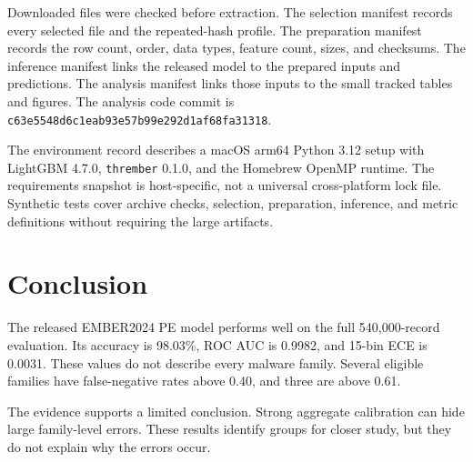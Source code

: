 \documentclass[11pt]{article}
\newcommand{\code}[1]{\texttt{#1}}
\begin{document}
Downloaded files were checked before extraction. The selection manifest records
every selected file and the repeated-hash profile. The preparation manifest
records the row count, order, data types, feature count, sizes, and checksums.
The inference manifest links the released model to the prepared inputs and
predictions. The analysis manifest links those inputs to the small tracked
tables and figures. The analysis code commit is
\code{c63e5548d6c1eab93e57b99e292d1af68fa31318}.

The environment record describes a macOS arm64 Python 3.12 setup with LightGBM
4.7.0, \code{thrember} 0.1.0, and the Homebrew OpenMP runtime. The requirements
snapshot is host-specific, not a universal cross-platform lock file. Synthetic
tests cover archive checks, selection, preparation, inference, and metric
definitions without requiring the large artifacts.

\section{Conclusion}

The released EMBER2024 PE model performs well on the full 540,000-record
evaluation. Its accuracy is 98.03\%, ROC AUC is 0.9982, and 15-bin ECE is
0.0031. These values do not describe every malware family. Several eligible
families have false-negative rates above 0.40, and three are above 0.61.

The evidence supports a limited conclusion. Strong aggregate calibration can
hide large family-level errors. These results identify groups for closer study,
but they do not explain why the errors occur.
\end{document}
